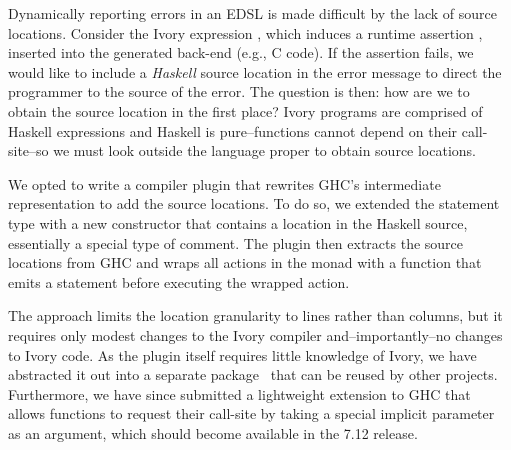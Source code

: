 
Dynamically reporting errors in an EDSL is made difficult by the lack of
source locations. Consider the Ivory expression \hbox{,} which induces a
runtime assertion , inserted into the generated back-end (e.g., C code). If the assertion fails, we would like to include
a \emph{Haskell} source location in the error message to direct the programmer to the source of
the error. The question is then: how are we to obtain the source location in the first place?
Ivory programs are comprised of Haskell expressions and Haskell is
pure--functions cannot depend on their call-site--so we must look outside the
language proper to obtain source locations.

We opted to write a compiler plugin that rewrites GHC's intermediate
representation to add the source locations. To do so, we extended the  statement type with a new
 constructor that contains a location in the Haskell source,
essentially a special type of comment. The plugin then extracts the source
locations from GHC and wraps all actions in the  monad with a
 function that emits a  statement before executing
the wrapped action.

The approach limits the location granularity to
lines rather than columns, but it requires only modest changes to the
Ivory compiler and--importantly--no changes to Ivory code. As the plugin
itself requires little knowledge of Ivory, we have abstracted it out into a
separate package~\cite{ghc-srcspan-plugin} that can be reused by other projects.
Furthermore, we have since submitted a lightweight extension to GHC that allows
functions to request their call-site by taking a special implicit
parameter~\cite{lewis2000implicit} as an argument, which should become available
in the 7.12 release.
